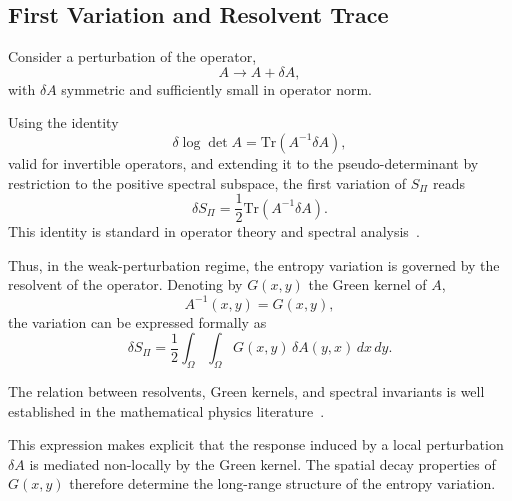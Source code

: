 \subsection{First Variation and Resolvent Trace}
  \label{subsec:first-variation}

  Consider a perturbation of the operator,
  \begin{equation}
    A \longrightarrow A + \delta A,
  \end{equation}
  with $\delta A$ symmetric and sufficiently small in operator norm.

  Using the identity
  \begin{equation}
    \delta \log \det A = \mathrm{Tr}(A^{-1} \delta A),
  \end{equation}
  valid for invertible operators,
  and extending it to the pseudo-determinant by restriction to the positive spectral subspace,
  the first variation of $S_\Pi$ reads
  \begin{equation}
    \delta S_\Pi
    = \frac12 \mathrm{Tr}(A^{-1} \delta A).
  \end{equation}
  This identity is standard in operator theory and spectral analysis~\cite{gilkey1995,vassilevich2003}.

  Thus, in the weak-perturbation regime, the entropy variation is governed
  by the resolvent of the operator.
  Denoting by $G(x,y)$ the Green kernel of $A$,
  \begin{equation}
    A^{-1}(x,y) = G(x,y),
  \end{equation}
  the variation can be expressed formally as
  \begin{equation}
    \delta S_\Pi
    = \frac12 \int_\Omega \int_\Omega
    G(x,y)\, \delta A(y,x)\, dx\, dy.
  \end{equation}

  The relation between resolvents, Green kernels, and spectral invariants
  is well established in the mathematical physics literature~\cite{vassilevich2003}.

  This expression makes explicit that the response induced by a local
  perturbation $\delta A$ is mediated non-locally by the Green kernel.
  The spatial decay properties of $G(x,y)$ therefore determine the
  long-range structure of the entropy variation.
